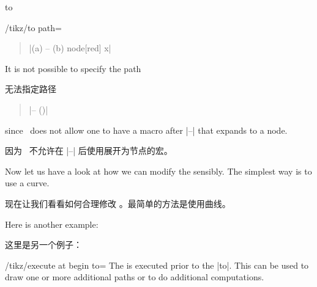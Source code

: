 \begin{pathoperation}{to}{
         }
\begin{key}{/tikz/to path=}
        \begin{quote}
            |(a) -- (b) node[red] {x}|
        \end{quote}

        It is not possible to specify the path

        无法指定路径

        \begin{quote}
            |-- \tikztonodes (\tikztotarget)|
        \end{quote}
        since \tikzname\ does not allow one to have a macro after |--| that
        expands to a node.

        因为 \tikzname\ 不允许在 |--| 后使用展开为节点的宏。


        Now let us have a look at how we can modify the  sensibly.
        The simplest way is to use a curve.

        现在让我们看看如何合理修改 。最简单的方法是使用曲线。

\begin{codeexample}[]
\end{codeexample}

        Here is another example:

        这里是另一个例子：

\begin{codeexample}[]

\end{codeexample}

        \begin{key}{/tikz/execute at begin to=}
            The  is executed prior to the |to|. This can be used to
            draw one or more additional paths or to do additional computations.


\end{key}
\end{key}
\end{pathoperation}

